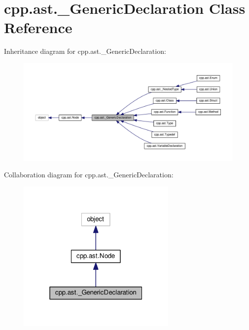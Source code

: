 \hypertarget{classcpp_1_1ast_1_1___generic_declaration}{}\section{cpp.\+ast.\+\_\+\+Generic\+Declaration Class Reference}
\label{classcpp_1_1ast_1_1___generic_declaration}


Inheritance diagram for cpp.\+ast.\+\_\+\+Generic\+Declaration\+:
\nopagebreak
\begin{figure}[H]
\begin{center}
\leavevmode
\includegraphics[width=350pt]{classcpp_1_1ast_1_1___generic_declaration__inherit__graph}
\end{center}
\end{figure}


Collaboration diagram for cpp.\+ast.\+\_\+\+Generic\+Declaration\+:
\nopagebreak
\begin{figure}[H]
\begin{center}
\leavevmode
\includegraphics[width=220pt]{classcpp_1_1ast_1_1___generic_declaration__coll__graph}
\end{center}
\end{figure}
